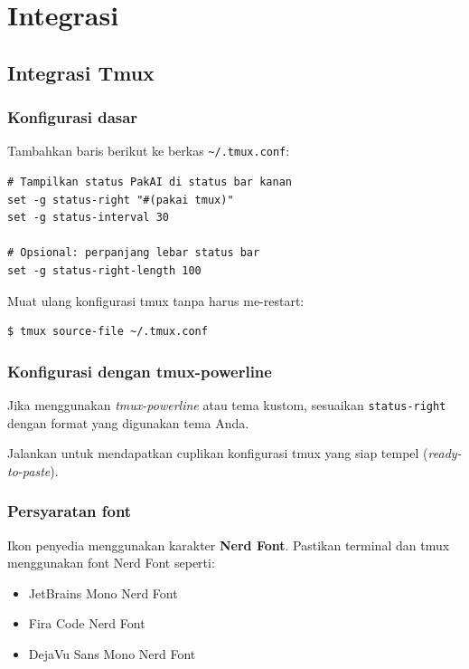 \chapter{Integrasi}

\section{Integrasi Tmux}

\subsection{Konfigurasi dasar}

Tambahkan baris berikut ke berkas \texttt{\textasciitilde/.tmux.conf}:

\begin{lstlisting}[style=toml]
# Tampilkan status PakAI di status bar kanan
set -g status-right "#(pakai tmux)"
set -g status-interval 30

# Opsional: perpanjang lebar status bar
set -g status-right-length 100
\end{lstlisting}

Muat ulang konfigurasi tmux tanpa harus me-restart:

\begin{lstlisting}[style=terminal]
$ tmux source-file ~/.tmux.conf
\end{lstlisting}

\subsection{Konfigurasi dengan tmux-powerline}

\begin{sloppypar}
Jika menggunakan \textit{tmux-powerline} atau tema kustom, sesuaikan
\texttt{status-right} dengan format yang digunakan tema Anda.
\end{sloppypar}

\begin{tipbox}
  Jalankan  untuk mendapatkan cuplikan konfigurasi tmux
  yang siap tempel (\textit{ready-to-paste}).
\end{tipbox}

\subsection{Persyaratan font}

Ikon penyedia menggunakan karakter \textbf{Nerd Font}. Pastikan terminal dan tmux
menggunakan font Nerd Font seperti:
\begin{itemize}
  \item JetBrains Mono Nerd Font
  \item Fira Code Nerd Font
  \item DejaVu Sans Mono Nerd Font
\end{itemize}


